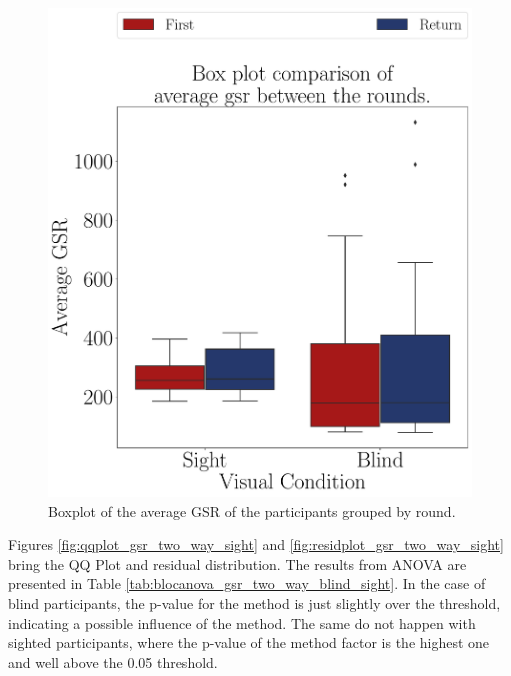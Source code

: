\begin{figure}[!htb]
\begin{minipage}{0.45\textwidth}
        \includegraphics[width = \textwidth]{Resultados/GSR/Figuras/pdf/boxplot_gsr_avg_4_rounds.pdf}
        \caption{Boxplot of the average GSR of the participants grouped by round.}
        \label{fig:boxplot_gsr_avg_4_rounds}
    \end{minipage}
\end{figure}

Figures \ref{fig:qqplot_gsr_two_way_sight} and \ref{fig:residplot_gsr_two_way_sight} bring the QQ Plot and residual distribution. The results from ANOVA are presented in Table \ref{tab:blocanova_gsr_two_way_blind_sight}. In the case of blind participants, the p-value for the method is just slightly over the threshold, indicating a possible influence of the method. The same do not happen with sighted participants, where the p-value of the method factor is the highest one and well above the 0.05 threshold.
 
%
%

